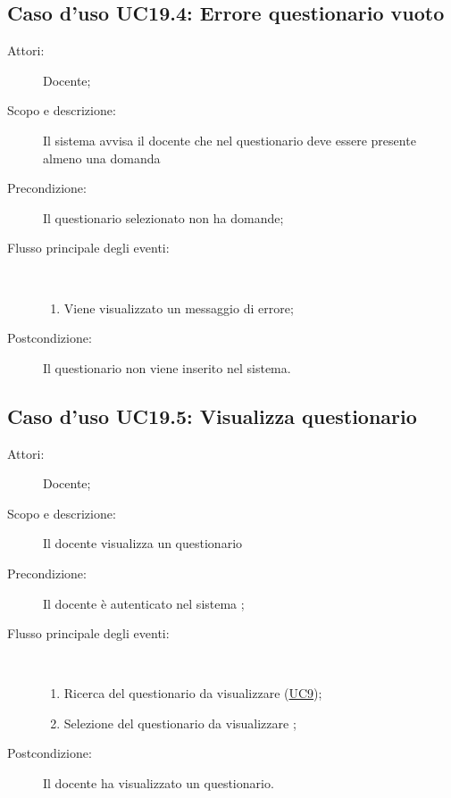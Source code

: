 \subsection{Caso d'uso UC19.4: Errore questionario vuoto}\begin{description}
\item[Attori:] Docente;
\item[Scopo e descrizione:] Il sistema avvisa il docente che nel questionario deve essere presente almeno una domanda
      \item[Precondizione:] Il questionario selezionato non ha domande;

        \item[Flusso principale degli eventi:] \ 
 \begin{enumerate}
          \item Viene visualizzato un messaggio di errore;

      \end{enumerate}
    \item[Postcondizione:] Il questionario non viene inserito nel sistema.
  \end{description}
\hypertarget{UC19.5}{}
\subsection{Caso d'uso UC19.5: Visualizza questionario}\begin{description}
\item[Attori:] Docente;
\item[Scopo e descrizione:] Il docente visualizza un questionario
      \item[Precondizione:] Il docente è autenticato nel sistema
;

        \item[Flusso principale degli eventi:] \ 
 \begin{enumerate}
          \item Ricerca del questionario da visualizzare	 (\hyperlink{UC9}{UC9});
          \item Selezione del questionario da visualizzare	;

      \end{enumerate}
    \item[Postcondizione:] Il docente ha visualizzato un questionario.
  \end{description}
\hypertarget{UC20}{}

